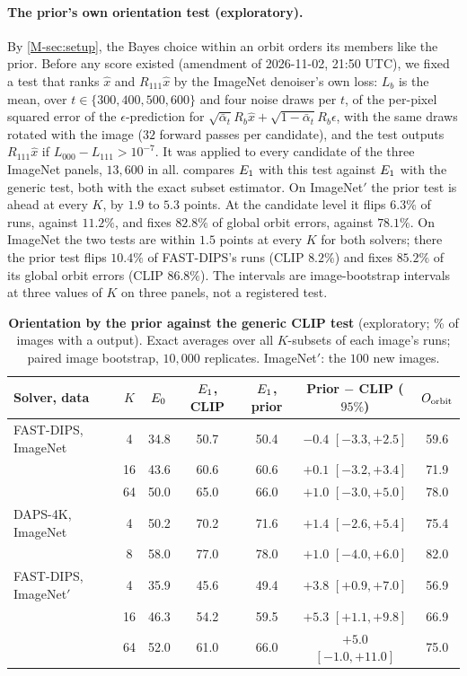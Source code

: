 \paragraph{The prior's own orientation test (exploratory).}
By \cref{M-sec:setup}, the Bayes choice within an orbit orders its members like the prior.
Before any score existed (amendment of 2026-11-02, 21:50 UTC), we fixed a test that ranks $\hat x$ and $R_{111}\hat x$ by the ImageNet denoiser's own loss: $L_b$ is the mean, over $t\in\{300,400,500,600\}$ and four noise draws per $t$, of the per-pixel squared error of the $\epsilon$-prediction for $\sqrt{\bar\alpha_t}R_b\hat x+\sqrt{1-\bar\alpha_t}R_b\epsilon$, with the same draws rotated with the image ($32$ forward passes per candidate), and the test outputs $R_{111}\hat x$ if $L_{000}-L_{111}>10^{-7}$.
It was applied to every candidate of the three ImageNet panels, $13{,}600$ in all.
 compares $E_1$ with this test against $E_1$ with the generic test, both with the exact subset estimator.
On ImageNet$'$ the prior test is ahead at every $K$, by $1.9$ to $5.3$ points.
At the candidate level it flips $6.3\%$ of \good runs, against $11.2\%$, and fixes $82.8\%$ of global orbit errors, against $78.1\%$.
On ImageNet the two tests are within $1.5$ points at every $K$ for both solvers; there the prior test flips $10.4\%$ of FAST-DIPS's \good runs (CLIP $8.2\%$) and fixes $85.2\%$ of its global orbit errors (CLIP $86.8\%$).
The intervals are image-bootstrap intervals at three values of $K$ on three panels, not a registered test.

\begin{table}[h]
\centering\small
\setlength{\tabcolsep}{4pt}
\begin{tabular}{@{}lcccccc@{}}
\toprule
Solver, data & $K$ & $E_0$ & $E_1$, CLIP & $E_1$, prior & Prior $-$ CLIP ($95\%$) & $O_{\mathrm{orbit}}$ \\
\midrule
FAST-DIPS, ImageNet & 4 & 34.8 & 50.7 & 50.4 & $-0.4$ $[-3.3,+2.5]$ & 59.6 \\
 & 16 & 43.6 & 60.6 & 60.6 & $+0.1$ $[-3.2,+3.4]$ & 71.9 \\
 & 64 & 50.0 & 65.0 & 66.0 & $+1.0$ $[-3.0,+5.0]$ & 78.0 \\
DAPS-4K, ImageNet & 4 & 50.2 & 70.2 & 71.6 & $+1.4$ $[-2.6,+5.4]$ & 75.4 \\
 & 8 & 58.0 & 77.0 & 78.0 & $+1.0$ $[-4.0,+6.0]$ & 82.0 \\
FAST-DIPS, ImageNet$'$ & 4 & 35.9 & 45.6 & 49.4 & $+3.8$ $[+0.9,+7.0]$ & 56.9 \\
 & 16 & 46.3 & 54.2 & 59.5 & $+5.3$ $[+1.1,+9.8]$ & 66.9 \\
 & 64 & 52.0 & 61.0 & 66.0 & $+5.0$ $[-1.0,+11.0]$ & 75.0 \\
\bottomrule
\end{tabular}
\caption{\textbf{Orientation by the prior against the generic CLIP test} (exploratory; \% of images with a \good output). Exact averages over all $K$-subsets of each image's runs; paired image bootstrap, $10{,}000$ replicates. ImageNet$'$: the $100$ new images.}
\label{tab:s4-prior}
\end{table}

